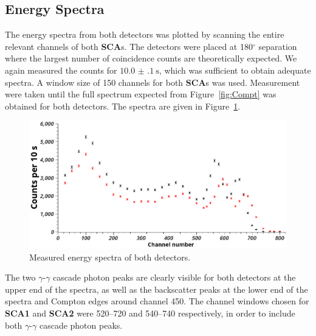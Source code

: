 \documentclass[twocolumn]{article}
\begin{document}
\subsection{Energy Spectra}
The energy spectra from both detectors was plotted by scanning the entire relevant channels of both \textbf{SCA}s. The detectors were placed at 180$^{\circ}$ separation where the largest number of coincidence counts are theoretically expected. We again measured the counts for $\SI[separate-uncertainty = true]{10.0(1) }{\second}$, which was sufficient to obtain adequate spectra. A window size of 150 channels for both \textbf{SCA}s was used. Measurement were taken until the full spectrum expected from Figure~\ref{fig:Compt} was obtained for both detectors. The spectra are given in Figure~\ref{fig:spectra}.
\begin{figure}[!h]
	\centering
	\includegraphics[width=0.9\linewidth]{detectors2.png}
	\caption{Measured energy spectra of both detectors.}
	\label{fig:spectra}
\end{figure}
The two $\gamma$-$\gamma$ cascade photon peaks are clearly visible for both detectors at the upper end of the spectra, as well as the backscatter peaks at the lower end of the spectra and Compton edges around channel 450. The channel windows chosen for \textbf{SCA1} and \textbf{SCA2} were 520--720 and 540--740 respectively, in order to include both $\gamma$-$\gamma$ cascade photon peaks.
\end{document}
